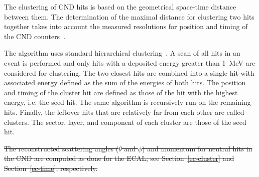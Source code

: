 The clustering of CND hits is based on the geometrical space-time distance between them. The determination of
the maximal distance for clustering two hits together takes into account the measured resolutions for position and
timing of the CND counters~\cite{cnd-nim}.

The algorithm uses standard hierarchical clustering~\cite{Day1984}. A scan of all hits in an event is performed and
only hits with a deposited energy greater than 1~MeV are considered for clustering. The two closest hits are
combined into a single hit with associated energy defined as the sum of the energies of both hits. The position and
timing of the cluster hit are defined as those of the hit with the highest energy, i.e. the seed hit. The same algorithm
is recursively run on the remaining hits. Finally, the leftover hits that are relatively far from each other are called
clusters. The sector, layer, and component of each cluster are those of the seed hit.

{\color{red}\sout{The reconstructed scattering angles ($\theta$ and $\phi$) and momentum for neutral hits in the CND are computed
as done for the ECAL, see Section~\ref{ec-cluster} and Section~\ref{ec-time}, respectively.}}
